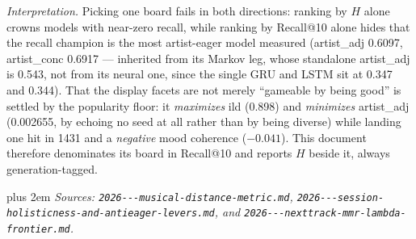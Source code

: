 \documentclass[11pt]{article}
\begin{document}
\emph{Interpretation.} Picking one board fails in both directions: ranking by
$H$ alone crowns models with near-zero recall, while ranking by Recall@10 alone
hides that the recall champion is the most artist-eager model measured
(artist\_adj \num{0.6097}, artist\_conc \num{0.6917} --- inherited from its
Markov leg, whose standalone artist\_adj is \num{0.543}, not from its neural
one, since the single GRU and LSTM sit at \num{0.347} and \num{0.344}). That the
display facets are not merely ``gameable by being good'' is settled by the
popularity floor: it \emph{maximizes} ild (\num{0.898}) and \emph{minimizes}
artist\_adj (\num{0.002655}, by echoing no seed at all rather than by being
diverse) while landing one hit in \num{1431} and a \emph{negative} mood
coherence ($-\num{0.041}$). This document therefore
denominates its board in Recall@10 and reports $H$ beside it, always
generation-tagged.

{\rightskip=0pt plus 2em \emph{Sources: \texttt{2026---\allowbreak musical-\allowbreak distance-\allowbreak metric.md},
\texttt{2026---\allowbreak session-\allowbreak holisticness-\allowbreak and-\allowbreak antieager-\allowbreak levers.md},
and \texttt{2026---\allowbreak nexttrack-\allowbreak mmr-\allowbreak lambda-\allowbreak frontier.md}.}\par}
\end{document}
